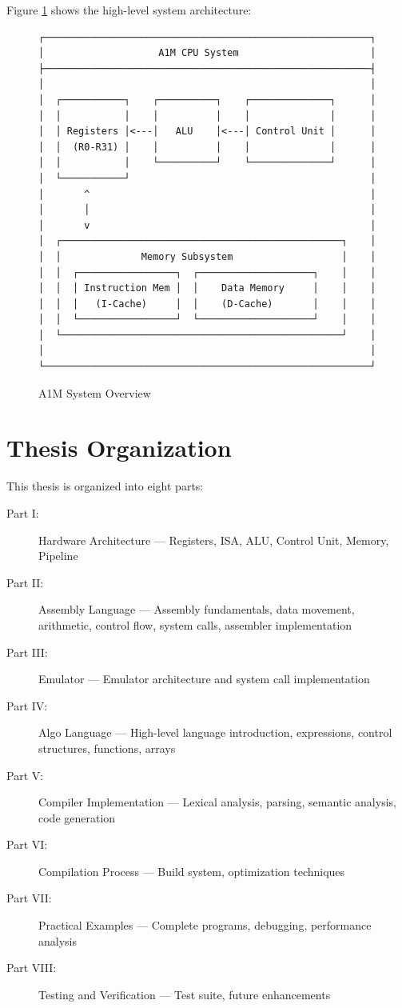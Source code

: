 \documentclass[12pt,a4paper,oneside]{book}
\begin{document}
Figure \ref{fig:system-overview} shows the high-level system architecture:

\begin{figure}[H]
\centering
\begin{verbatim}
┌─────────────────────────────────────────────────────────┐
│                    A1M CPU System                       │
├─────────────────────────────────────────────────────────┤
│                                                         │
│  ┌───────────┐    ┌──────────┐    ┌──────────────┐      │
│  │           │    │          │    │              │      │
│  │ Registers │<---│   ALU    │<---│ Control Unit │      │
│  │  (R0-R31) │    │          │    │              │      │
│  │           │    └──────────┘    └──────────────┘      │
│  └───────────┘                                          │
│       ^                                                 │
│       │                                                 │
│       v                                                 │
│  ┌─────────────────────────────────────────────────┐    │
│  │              Memory Subsystem                   │    │
│  │  ┌─────────────────┐  ┌────────────────────┐    │    │
│  │  │ Instruction Mem │  │    Data Memory     │    │    │
│  │  │   (I-Cache)     │  │    (D-Cache)       │    │    │
│  │  └─────────────────┘  └────────────────────┘    │    │
│  └─────────────────────────────────────────────────┘    │
│                                                         │
└─────────────────────────────────────────────────────────┘
\end{verbatim}
\caption{A1M System Overview}
\label{fig:system-overview}
\end{figure}

\section{Thesis Organization}

This thesis is organized into eight parts:

\begin{description}
    \item[Part I:] Hardware Architecture --- Registers, ISA, ALU, Control Unit, Memory, Pipeline
    \item[Part II:] Assembly Language --- Assembly fundamentals, data movement, arithmetic, control flow, system calls, assembler implementation
    \item[Part III:] Emulator --- Emulator architecture and system call implementation
    \item[Part IV:] Algo Language --- High-level language introduction, expressions, control structures, functions, arrays
    \item[Part V:] Compiler Implementation --- Lexical analysis, parsing, semantic analysis, code generation
    \item[Part VI:] Compilation Process --- Build system, optimization techniques
    \item[Part VII:] Practical Examples --- Complete programs, debugging, performance analysis
    \item[Part VIII:] Testing and Verification --- Test suite, future enhancements
\end{description}
\end{document}
